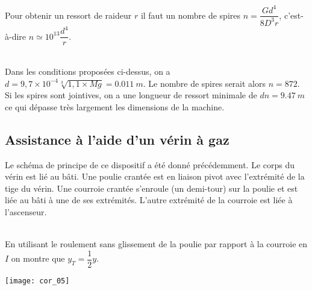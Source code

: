 \begin{multicols}{2}
Pour obtenir un ressort de raideur $r$ il faut un nombre de spires $n=\dfrac{Gd^4}{8D^3 r}$, c'est-à-dire $n\simeq 10^{13}\dfrac{d^4}{r}$.

\fi
{}
\ifprof
\begin{corrige}~\\
Dans les conditions proposées ci-dessus, on a $d=9,7 \times 10^{-4}\sqrt[3]{1,1\times Mg}= \SI{0,011}{m}$. 
Le nombre de spires serait alors $n=872$. Si les spires sont jointives, on a une longueur de ressort minimale de $dn =\SI{9,47}{m}$ ce qui dépasse très largement les dimensions de la machine.  
\end{corrige}
\else
\fi

\subsection*{Assistance à l’aide d’un vérin à gaz}
\ifprof
\else
Le schéma de principe de ce dispositif a été donné précédemment. Le corps du vérin est lié au bâti. Une poulie crantée
est en liaison pivot avec l’extrémité de la tige du vérin. Une courroie crantée s’enroule (un demi-tour) sur la poulie et est liée au bâti à une de ses extrémités. L’autre extrémité de la courroie est liée à l’ascenseur.
\fi

\ifprof
\begin{corrige}~\\

En utilisant le roulement sans glissement de la poulie par rapport à la courroie en $I$ on montre que $y_T = \dfrac{1}{2}y$.
\begin{center}
\texttt{[image: cor\_05]}
\end{center}
\end{corrige}
\else
\fi



\ifprof
\begin{corrige}~\\


\end{corrige}
\end{multicols}
